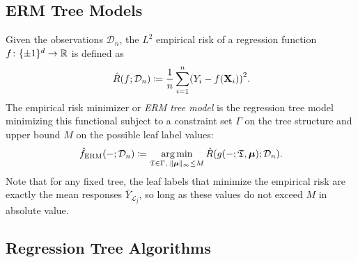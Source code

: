 \documentclass[11pt]{article}
\newcommand{\bx}{\mathbf{x}}
\newcommand{\bX}{\mathbf{X}}
\newcommand{\bmu}{\boldsymbol{\mu}}
\DeclareMathOperator*{\argmin}{arg\,min}
\DeclarePairedDelimiter{\braces}{\lbrace}{\rbrace}
\DeclarePairedDelimiter{\paren}{(}{)}
\DeclarePairedDelimiter{\norm}{\|}{\|}
\newcommand{\R}{\mathbb{R}}
\newcommand{\indicator}{\mathbb{1}}
\newcommand{\tree}{\mathfrak{T}}
\newcommand{\leaf}{\mathcal{L}}
\newcommand{\nleaves}{b}
\newcommand{\leafparam}{\mu}
\newcommand{\binspace}{\braces{\pm 1}^\nfeats}
\newcommand{\nfeats}{d}
\newcommand{\nsamples}{n}
\newcommand{\data}[1][n]{\mathcal{D}_{#1}}
\newcommand{\cellsampindices}{I}
\newcommand{\constraint}{\Gamma}
\begin{document}



\subsection{ERM Tree Models}
Given the observations $\data$, the $L^2$ empirical risk of a regression function $f\colon \binspace \to \R$ is defined as
\begin{equation} \label{eq:empirical_risk}
    \hat R(f;\data) \coloneqq \frac{1}{\nsamples}\sum_{i=1}^\nsamples \paren*{Y_i - f(\bX_i)}^2.
\end{equation}
The empirical risk minimizer or \emph{ERM tree model} is the regression tree model minimizing this functional subject to a constraint set $\constraint$ on the tree structure and upper bound $M$ on the possible leaf label values:
\begin{equation} \label{eq:ERM_equation}
    \hat f_{\text{ERM}}(-;\data) \coloneqq \argmin_{\tree \in \constraint,\;\norm{\bmu}_\infty \leq M} \hat R\paren*{g(-;\tree,\bmu);\data}.
\end{equation}
Note that for any fixed tree, the leaf labels that minimize the empirical risk are exactly the mean responses $\bar Y_{\leaf_j}$, so long as these values do not exceed $M$ in absolute value.

\subsection{Regression Tree Algorithms}
\end{document}
